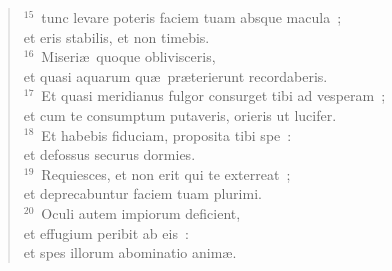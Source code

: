 \begin{flushleft}
\begin{verse}
${}^{15}$~tunc levare poteris faciem tuam absque macula~;\\ et eris stabilis, et non timebis.\\
${}^{16}$~Miseri\ae\ quoque oblivisceris,\\ et quasi aquarum qu\ae\ pr\ae terierunt recordaberis.\\
${}^{17}$~Et quasi meridianus fulgor consurget tibi ad vesperam~;\\ et cum te consumptum putaveris, orieris ut lucifer.\\
${}^{18}$~Et habebis fiduciam, proposita tibi spe~:\\ et defossus securus dormies.\\
${}^{19}$~Requiesces, et non erit qui te exterreat~;\\ et deprecabuntur faciem tuam plurimi.\\
${}^{20}$~Oculi autem impiorum deficient,\\ et effugium peribit ab eis~:\\ et spes illorum abominatio anim\ae .\end{verse}\end{flushleft}


